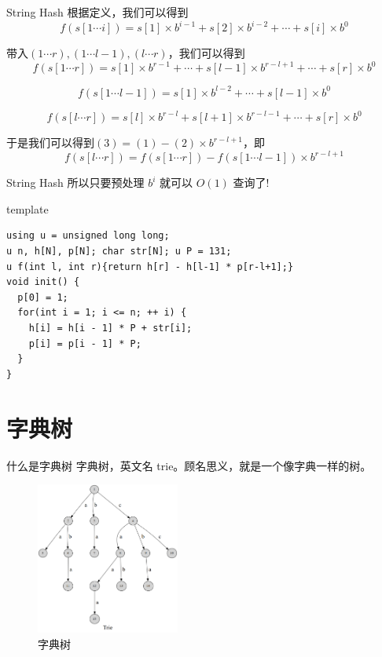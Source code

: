 \documentclass{ldr-simple-gray}
\begin{document}
  \begin{frame}{String Hash}
    根据定义，我们可以得到
    $$f(s[1\cdots i])=s[1]\times{b^{i-1}}+s[2]\times{b^{i-2}}+\cdots+s[i]\times{b^{0}}$$

    带入$(1\cdots r),(1\cdots l-1),(l\cdots r)$，我们可以得到
    \begin{equation}
      f(s[1\cdots r])=s[1]\times{b^{r-1}}+\cdots+s[l-1]\times{b^{r-l+1}}+\cdots+s[r]\times{b^{0}}
    \end{equation}
    
    \begin{equation}
      f(s[1\cdots l-1])=s[1]\times{b^{l-2}}+\cdots+s[l-1]\times{b^{0}}
    \end{equation}
    
    \begin{equation}
      f(s[l\cdots r])=s[l]\times{b^{r-l}}+s[l+1]\times{b^{r-l-1}}+\cdots+s[r]\times{b^{0}}
    \end{equation}

    于是我们可以得到$(3)=(1)-(2)\times{b^{r-l+1}}$，即
    $$f(s[l\cdots r])=f(s[1\cdots r])-f(s[1\cdots l-1])\times{b^{r-l+1}}$$
  \end{frame}

  \begin{frame}[fragile]{String Hash}
    所以只要预处理 $b^i$ 就可以 $O(1)$ 查询了!
    \begin{block}{template}
      \begin{verbatim}
using u = unsigned long long;
u n, h[N], p[N]; char str[N]; u P = 131;
u f(int l, int r){return h[r] - h[l-1] * p[r-l+1];} 
void init() {
  p[0] = 1;
  for(int i = 1; i <= n; ++ i) {
    h[i] = h[i - 1] * P + str[i];
    p[i] = p[i - 1] * P;
  }
}\end{verbatim}
    \end{block}
  \end{frame}

  \section{字典树}
  \begin{frame}{什么是字典树}
    字典树，英文名 trie。顾名思义，就是一个像字典一样的树。
    \begin{figure}
      \centering
      \includegraphics[height=5cm]{./images/trie1.png}
      \caption{字典树}
    \end{figure}
  \end{frame}
\end{document}
